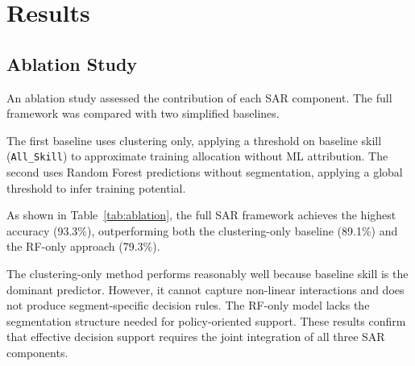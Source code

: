 \documentclass[3p,twocolumn,authoryear]{elsarticle}
\begin{document}
\section{Results}

\subsection{Ablation Study}

An ablation study assessed the contribution of each SAR component.
The full framework was compared with two simplified baselines.

The first baseline uses clustering only, applying a threshold on baseline
skill (\texttt{All\_Skill}) to approximate training allocation without
ML attribution.
The second uses Random Forest predictions without segmentation, applying
a global threshold to infer training potential.

As shown in Table~\ref{tab:ablation}, the full SAR framework achieves the
highest accuracy (93.3\%), outperforming both the clustering-only baseline
(89.1\%) and the RF-only approach (79.3\%).

The clustering-only method performs reasonably well because baseline skill
is the dominant predictor.
However, it cannot capture non-linear interactions and does not produce
segment-specific decision rules.
The RF-only model lacks the segmentation structure needed for
policy-oriented support.
These results confirm that effective decision support requires the joint
integration of all three SAR components.

\begin{table}[htbp]
\centering
\caption{Ablation study: SAR versus simplified baselines.}
\label{tab:ablation}
\end{table}
\end{document}
